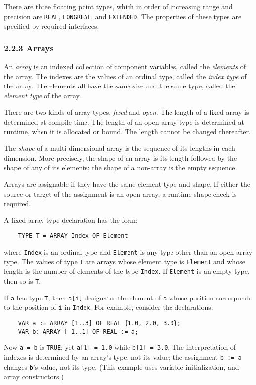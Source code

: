 \documentclass[10pt]{article}
\begin{document}
There are three floating point types, which in order of increasing range and
precision are \verb|REAL|, \verb|LONGREAL|, and \verb|EXTENDED|.  The
properties of these types are specified by required interfaces.

\subsubsection*{2.2.3 Arrays}

An \emph{array} is an indexed collection of component variables, called the
\emph{elements} of the array.  The indexes are the values of an ordinal type,
called the \emph{index type} of the array.  The elements all have the same
size and the same type, called the \emph{element type} of the array.

There are two kinds of array types, \emph{fixed} and \emph{open}.  The length
of a fixed array is determined at compile time.  The length of an open array
type is determined at runtime, when it is allocated or bound.  The length
cannot be changed thereafter.

The \emph{shape} of a multi-dimensional array is the sequence of its lengths
in each dimension.  More precisely, the shape of an array is its length
followed by the shape of any of its elements; the shape of a non-array is the
empty sequence.

Arrays are assignable if they have the same element type and shape.  If either
the source or target of the assignment is an open array, a runtime shape check
is required.

A fixed array type declaration has the form:
\begin{verbatim}
    TYPE T = ARRAY Index OF Element
\end{verbatim}
where \verb|Index| is an ordinal type and \verb|Element| is any type other
than an open array type.  The values of type \verb|T| are arrays whose element
type is \verb|Element| and whose length is the number of elements of the type
\verb|Index|.  If \verb|Element| is an empty type, then so is \verb|T|.

If \verb|a| has type \verb|T|, then \verb|a[i]| designates the element of
\verb|a| whose position corresponds to the position of \verb|i| in
\verb|Index|.  For example, consider the declarations:
\begin{verbatim}
    VAR a := ARRAY [1..3] OF REAL {1.0, 2.0, 3.0};
    VAR b: ARRAY [-1..1] OF REAL := a;
\end{verbatim}
Now \verb|a = b| is \verb|TRUE|; yet \verb|a[1] = 1.0| while
\verb|b[1] = 3.0|.  The interpretation of indexes is determined by an array's
type, not its value; the assignment \verb|b := a| changes \verb|b|'s value,
not its type.  (This example uses variable initialization, and array
constructors.)
\end{document}
